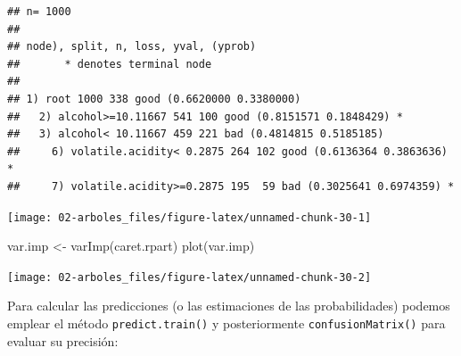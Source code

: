 \documentclass[
]{book}
\newenvironment{Shaded}{\begin{snugshade}}{\end{snugshade}}
\newcommand{\AttributeTok}[1]{\textcolor[rgb]{0.77,0.63,0.00}{#1}}
\newcommand{\CommentTok}[1]{\textcolor[rgb]{0.56,0.35,0.01}{\textit{#1}}}
\newcommand{\FunctionTok}[1]{\textcolor[rgb]{0.00,0.00,0.00}{#1}}
\newcommand{\NormalTok}[1]{#1}
\newcommand{\OtherTok}[1]{\textcolor[rgb]{0.56,0.35,0.01}{#1}}
\newcommand{\SpecialCharTok}[1]{\textcolor[rgb]{0.00,0.00,0.00}{#1}}
\newcommand{\StringTok}[1]{\textcolor[rgb]{0.31,0.60,0.02}{#1}}
\theoremstyle{break}
\theoremstyle{definition}
\theoremstyle{definition}
\theoremstyle{definition}
\theoremstyle{definition}
\theoremstyle{remark}
\begin{document}
\begin{verbatim}
## n= 1000 
## 
## node), split, n, loss, yval, (yprob)
##       * denotes terminal node
## 
## 1) root 1000 338 good (0.6620000 0.3380000)  
##   2) alcohol>=10.11667 541 100 good (0.8151571 0.1848429) *
##   3) alcohol< 10.11667 459 221 bad (0.4814815 0.5185185)  
##     6) volatile.acidity< 0.2875 264 102 good (0.6136364 0.3863636) *
##     7) volatile.acidity>=0.2875 195  59 bad (0.3025641 0.6974359) *
\end{verbatim}

\begin{Shaded}
\end{Shaded}

\begin{center}\texttt{[image: 02-arboles\_files/figure-latex/unnamed-chunk-30-1]} \end{center}

\begin{Shaded}
\begin{Highlighting}[]
\NormalTok{var.imp }\OtherTok{\textless{}{-}} \FunctionTok{varImp}\NormalTok{(caret.rpart)}
\FunctionTok{plot}\NormalTok{(var.imp)}
\end{Highlighting}
\end{Shaded}

\begin{center}\texttt{[image: 02-arboles\_files/figure-latex/unnamed-chunk-30-2]} \end{center}

Para calcular las predicciones (o las estimaciones de las probabilidades) podemos emplear el método \texttt{predict.train()} y posteriormente \texttt{confusionMatrix()} para evaluar su precisión:

\begin{Shaded}
\end{Shaded}
\end{document}
